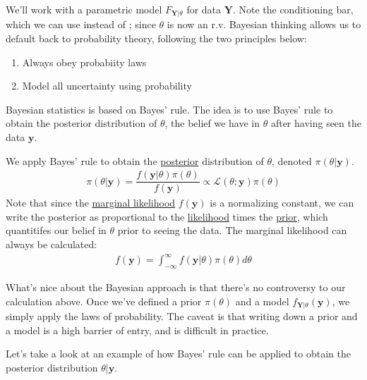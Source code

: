 \documentclass[12pt]{article}
\begin{document}
\medskip

\noindent We'll work with a parametric model $F_{\textbf{Y}|\theta}$ for data $\textbf{Y}$. Note the conditioning bar, which we can use instead of ; since $\theta$ is now an r.v. Bayesian thinking allows us to default back to probability theory, following the two principles below:
\begin{enumerate}
    \item Always obey probabiity laws
    \item Model all uncertainty using probability
\end{enumerate}

\noindent Bayesian statistics is based on Bayes' rule. The idea is to use Bayes' rule to obtain the posterior distribution of $\theta$, the belief we have in $\theta$ after having seen the data $\textbf{y}$.

\medskip

\begin{tcolorbox}[breakable, title = \textbf{Definition}: Posterior distribution]
    We apply Bayes' rule to obtain the \underline{posterior} distribution of $\theta$, denoted $\pi(\theta|\textbf{y})$.
    \begin{align*}
        \pi(\theta |\textbf{y}) = \dfrac{f(\textbf{y}|\theta)\pi(\theta)}{f(\textbf{y})} \propto \mathcal{L}(\theta;\textbf{y})\pi(\theta)
    \end{align*}
    Note that since the \underline{marginal likelihood} $f(\textbf{y})$ is a normalizing constant, we can write the posterior as proportional to the \underline{likelihood} times the \underline{prior}, which quantitifes our belief in $\theta$ prior to seeing the data. The marginal likelihood can always be calculated:
    \begin{align*}
        f(\textbf{y}) = \int_{-\infty}^{\infty} f(\textbf{y}|\theta)\pi(\theta)d\theta
    \end{align*}
    
\end{tcolorbox}
\medskip

\noindent What's nice about the Bayesian approach is that there's no controversy to our calculation above. Once we've defined a prior $\pi(\theta)$ and a model $f_{\textbf{Y}|\theta} (\textbf{y})$, we simply apply the laws of probability. The caveat is that writing down a prior and a model is a high barrier of entry, and is difficult in practice.

\medskip
\noindent Let's take a look at an example of how Bayes' rule can be applied to obtain the posterior distribution $\theta |\textbf{y}$.
\end{document}
